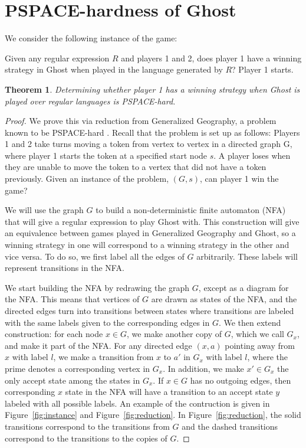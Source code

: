 \documentclass[11pt]{article}
\newtheorem{theorem}{Theorem}
\begin{document}
\section{PSPACE-hardness of Ghost}
We consider the following instance of the game:

Given any regular expression $R$ and players 1 and 2, does player 1 have a winning strategy in Ghost when played in the language generated by $R$? Player 1 starts.
\begin{theorem} Determining whether player 1 has a winning strategy when Ghost is played over regular languages is PSPACE-hard.
\end{theorem}
\begin{proof} We prove this via reduction from Generalized Geography, a problem known to be PSPACE-hard \cite{theoryofcomp}. Recall that the problem is set up as follows:
Players 1 and 2 take turns moving a token from vertex to vertex in a directed graph G, where player 1 starts the token at a specified start node $s$. A player loses when they are unable to move the token to a vertex that did not have a token previously. Given an instance of the problem, $(G,s)$, can player 1 win the game?

We will use the graph $G$ to build a non-deterministic finite automaton (NFA) that will give a regular expression to play Ghost with. This construction will give an equivalence between games played in Generalized Geography and Ghost, so a winning strategy in one will correspond to a winning strategy in the other and vice versa. To do so, we first label all the edges of $G$ arbitrarily. These labels will represent transitions in the NFA.

We start building the NFA by redrawing the graph $G$, except as a diagram for the NFA. This means that vertices of $G$ are drawn as states of the NFA, and the directed edges turn into transitions between states where transitions are labeled with the same labels given to the corresponding edges in $G$. We then extend construction: for each node $x\in G$, we make another copy of $G$, which we call $G_x$, and make it part of the NFA. For any directed edge $(x,a)$ pointing away from $x$ with label $l$, we make a transition from $x$ to $a'$ in $G_x$ with label $l$, where the prime denotes a corresponding vertex in $G_x$. In addition, we make $x' \in G_x$  the only accept state among the states in $G_x$. If $x\in G$ has no outgoing edges, then corresponding $x$ state in the NFA will have a transition to an accept state $y$ labeled with all possible labels. An example of the contruction is given in Figure~\ref{fig:instance} and Figure~\ref{fig:reduction}. In Figure~\ref{fig:reduction}, the solid transitions correspond to the transitions from $G$ and the dashed transitions correspond to the transitions to the copies of $G$.


\end{proof}
\end{document}
